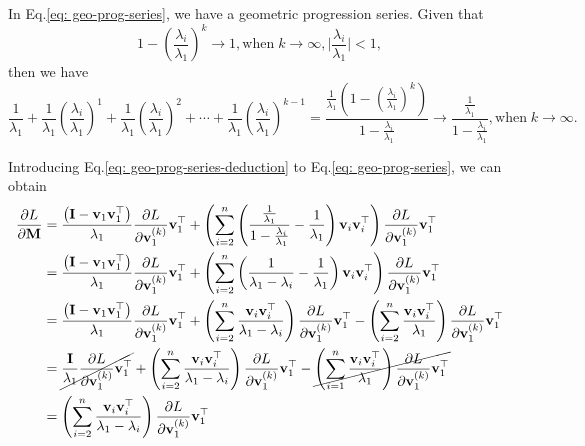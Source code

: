 \documentclass{article}
\newcommand{\bM}{\mathbf{M}}
\newcommand{\bv}{\mathbf{v}}
\newcommand{\bI}{\mathbf{I}}
\begin{document}
	In Eq.\ref{eq: geo-prog-series}, we have a geometric progression series.
	Given that $${1 - (\frac{\lambda_{i}}{\lambda_{1}})^k \rightarrow 1}, \text{when} \; k\rightarrow\infty, \vert \frac{\lambda_{i}}{\lambda_{1}} \vert<1,$$
	then we have
	\begin{equation}
	\frac{1}{\lambda_{1}} +
	\frac{1}{\lambda_{1}}\left(\frac{\lambda_{i}}{\lambda_{1}}\right)^{1} +
	\frac{1}{\lambda_{1}}\left(\frac{\lambda_{i}}{\lambda_{1}}\right)^{2} + \cdots +
	\frac{1}{\lambda_{1}}\left(\frac{\lambda_{i}}{\lambda_{1}}\right)^{k-1} = \frac{\frac{1}{\lambda_{1}}(1- (\frac{\lambda_{i}}{\lambda_{1}})^k)} {1 - \frac{\lambda_{i}}{\lambda_{1}}} 
	\rightarrow  \frac{\frac{1}{\lambda_{1}}}
	{1 - \frac{\lambda_{i}}{\lambda_{1}}}, \text{when} \; k\rightarrow\infty.
	\label{eq: geo-prog-series-deduction}
	\end{equation}
	
	Introducing Eq.\ref{eq: geo-prog-series-deduction} to Eq.\ref{eq: geo-prog-series}, we can obtain	
	\begin{equation}
	\begin{aligned}
	\frac{\partial L}{\partial \bM}
	&=\frac{\left(\bI-\bv_{1} \bv_{1}^{\top}\right)}{\lambda_{1}} \frac{\partial L}{\partial \bv_{1}^{(k)}}\bv_{1}^{\top} +
	\left(\sum_{i=2}^{n}\left(
	\frac{\frac{1}{\lambda_{1}}}
	{1 - \frac{\lambda_{i}}{\lambda_{1}}}
	- \frac{1}{\lambda_{1}}
	\right)
	\bv_{i}\bv_{i}^{\top}
	\right)\frac{\partial L}{\partial \bv_{1}^{(k)}}\bv_{1}^{\top}\\
	&=\frac{\left(\bI-\bv_{1} \bv_{1}^{\top}\right)}{\lambda_{1}} \frac{\partial L}{\partial \bv_{1}^{(k)}}\bv_{1}^{\top} +
	\left(\sum_{i=2}^{n}\left(
	\frac{1}
	{\lambda_{1} - \lambda_{i}}
	- \frac{1}{\lambda_{1}}
	\right)
	\bv_{i}\bv_{i}^{\top}
	\right)\frac{\partial L}{\partial \bv_{1}^{(k)}}\bv_{1}^{\top}\\
	&=\frac{\left(\bI-\bv_{1} \bv_{1}^{\top}\right)}{\lambda_{1}} \frac{\partial L}{\partial \bv_{1}^{(k)}}\bv_{1}^{\top} +
	\left(\sum_{i=2}^{n}
	\frac{\bv_{i}\bv_{i}^{\top}}
	{\lambda_{1} - \lambda_{i}}
	\right)\frac{\partial L}{\partial \bv_{1}^{(k)}}\bv_{1}^{\top} -
	\left(\sum_{i=2}^{n}
	\frac{\bv_{i}\bv_{i}^{\top}}
	{\lambda_{1}}
	\right)\frac{\partial L}{\partial \bv_{1}^{(k)}}\bv_{1}^{\top}\\
	&=\cancel{\frac{\bI}{\lambda_{1}}\frac{\partial L}{\partial \bv_{1}^{(k)}}\bv_{1}^{\top}} +
	\left(\sum_{i=2}^{n}
	\frac{\bv_{i}\bv_{i}^{\top}}
	{\lambda_{1} - \lambda_{i}}
	\right)\frac{\partial L}{\partial \bv_{1}^{(k)}}\bv_{1}^{\top} -
	\cancel{
	\left(\sum_{i=1}^{n}
	\frac{\bv_{i}\bv_{i}^{\top}}
	{\lambda_{1}}
	\right)\frac{\partial L}{\partial \bv_{1}^{(k)}}\bv_{1}^{\top}}\\
	&=\left(\sum_{i=2}^{n}
	\frac{\bv_{i}\bv_{i}^{\top}}
	{\lambda_{1} - \lambda_{i}}
	\right)\frac{\partial L}{\partial \bv_{1}^{(k)}}\bv_{1}^{\top}\\
	\end{aligned}
	\end{equation}
	
\end{document}
